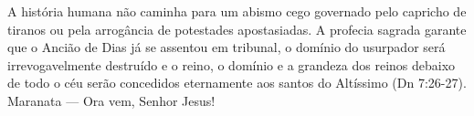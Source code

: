 A história humana não caminha para um abismo cego governado pelo capricho de tiranos ou pela arrogância de potestades apostasiadas. A profecia sagrada garante que o Ancião de Dias já se assentou em tribunal, o domínio do usurpador será irrevogavelmente destruído e o reino, o domínio e a grandeza dos reinos debaixo de todo o céu serão concedidos eternamente aos santos do Altíssimo (Dn 7:26-27). Maranata — Ora vem, Senhor Jesus!
